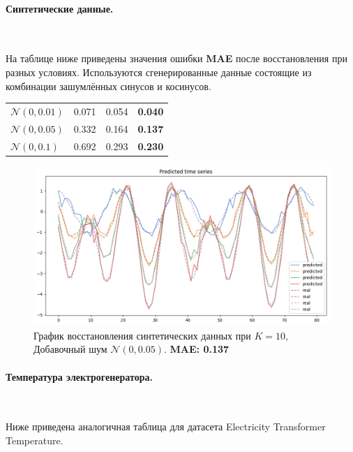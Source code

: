 \documentclass{article}
\begin{document}
\paragraph{Синтетические данные.}\

На таблице ниже приведены значения ошибки \textbf{MAE} после восстановления при разных условиях. Используются сгенерированные данные состоящие из комбинации зашумлённых синусов и косинусов.

\def\arraystretch{1.5}
\begin{tabular}{|l|*{3}{c|}}\hline
	\backslashbox{Шум}{Параметры}
	&\makebox[3em]{$K=2$}&\makebox[3em]{$K=4$}&\makebox[3em]{$K=10$}\\\hline
	$\mathcal{N}(0, 0.01)$ &0.071&0.054&\textbf{0.040}\\\hline
	$\mathcal{N}(0, 0.05)$ &0.332&0.164&\textbf{0.137}\\\hline
	$\mathcal{N}(0, 0.1)$  &0.692&0.293&\textbf{0.230}\\\hline
\end{tabular}


\begin{figure}[H]
	\centering
	\includegraphics[width=\textwidth]{K10N005.png}
	\caption{График восстановления синтетических данных при $K=10$, Добавочный шум $\mathcal{N}(0, 0.05)$. \textbf{MAE: 0.137}}
	\label{fig:fig6}
\end{figure}

\paragraph{Температура электрогенератора.}\

Ниже приведена аналогичная таблица для датасета Electricity Transformer Temperature.
\end{document}
